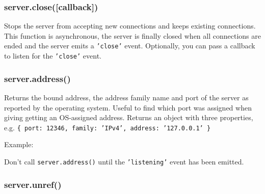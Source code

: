 \subsubsection{server.close({[}callback{]})}\label{server.closecallback}

Stops the server from accepting new connections and keeps existing
connections. This function is asynchronous, the server is finally closed
when all connections are ended and the server emits a \texttt{'close'}
event. Optionally, you can pass a callback to listen for the
\texttt{'close'} event.

\subsubsection{server.address()}\label{server.address}

Returns the bound address, the address family name and port of the
server as reported by the operating system. Useful to find which port
was assigned when giving getting an OS-assigned address. Returns an
object with three properties, e.g.
\texttt{\{ port: 12346, family: 'IPv4', address: '127.0.0.1' \}}

Example:

\begin{Shaded}
\end{Shaded}

Don't call \texttt{server.address()} until the \texttt{'listening'}
event has been emitted.

\subsubsection{server.unref()}\label{server.unref}

